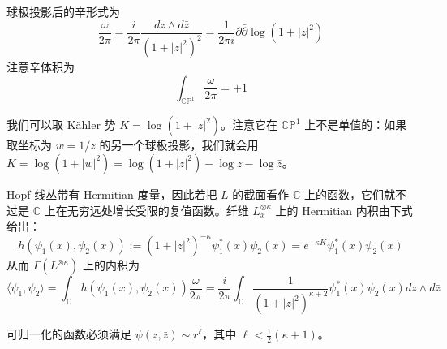 球极投影后的辛形式为
\begin{equation}
  \frac{\omega}{2\pi}=\frac{i}{2\pi}\frac{dz\wedge d\bar z}{(1+|z|^2)^2}=\frac{1}{2\pi i}\partial\bar\partial\log(1+|z|^2)
  \tag{B.28}
  \label{eq:B.28}
\end{equation}
注意辛体积为
\begin{equation}
  \int_{\mathbb{CP}^1}\frac{\omega}{2\pi}=+1
  \tag{B.29}
  \label{eq:B.29}
\end{equation}

我们可以取 Kähler 势 $K=\log(1+|z|^2)$。注意它在 $\mathbb{CP}^1$ 上不是单值的：如果取坐标为 $w=1/z$ 的另一个球极投影，我们就会用 $K=\log(1+|w|^2)=\log(1+|z|^2)-\log z-\log\bar z$。

Hopf 线丛带有 Hermitian 度量，因此若把 $L$ 的截面看作 $\mathbb{C}$ 上的函数，它们就不过是 $\mathbb{C}$ 上在无穷远处增长受限的复值函数。纤维 $L_x^{\otimes\kappa}$ 上的 Hermitian 内积由下式给出：
\begin{equation}
  h(\psi_1(x),\psi_2(x)):=(1+|z|^2)^{-\kappa}\psi_1^*(x)\psi_2(x)=e^{-\kappa K}\psi_1^*(x)\psi_2(x)
  \tag{B.30}
  \label{eq:B.30}
\end{equation}
从而 $\Gamma(L^{\otimes\kappa})$ 上的内积为
\begin{equation}
  \langle\psi_1,\psi_2\rangle=\int_{\mathbb{C}}h(\psi_1(x),\psi_2(x))\frac{\omega}{2\pi}
  =\frac{i}{2\pi}\int_{\mathbb{C}}\frac{1}{(1+|z|^2)^{\kappa+2}}\psi_1^*(x)\psi_2(x)dz\wedge d\bar z
  \tag{B.31}
  \label{eq:B.31}
\end{equation}

可归一化的函数必须满足 $\psi(z,\bar z)\sim r^\ell$，其中 $\ell<\frac{1}{2}(\kappa+1)$。

